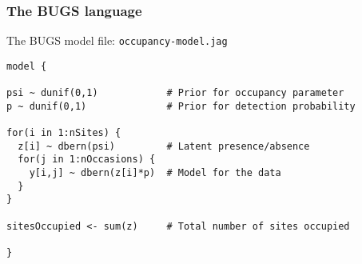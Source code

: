 \documentclass[color=usenames,dvipsnames,handout]{beamer}\usepackage[]{graphicx}\usepackage[]{xcolor}
\makeatletter
\newenvironment{kframe}{%
 \def\at@end@of@kframe{}%
 \ifinner\ifhmode%
  \def\at@end@of@kframe{\end{minipage}}%
  \begin{minipage}{\columnwidth}%
 \fi\fi%
 \def\FrameCommand##1{\hskip\@totalleftmargin \hskip-\fboxsep
 \colorbox{shadecolor}{##1}\hskip-\fboxsep
     \hskip-\linewidth \hskip-\@totalleftmargin \hskip\columnwidth}%
 \MakeFramed {\advance\hsize-\width
   \@totalleftmargin\z@ \linewidth\hsize
   \@setminipage}}%
 {\par\unskip\endMakeFramed%
 \at@end@of@kframe}
\newenvironment{knitrout}{}{} %
\makeatother
\begin{document}
\begin{frame}[fragile]
  \frametitle{The BUGS language}
  The BUGS model file: {\tt occupancy-model.jag}
\begin{knitrout}\scriptsize
{}\color{fgcolor}\begin{kframe}
\begin{verbatim}
model {

psi ~ dunif(0,1)            # Prior for occupancy parameter
p ~ dunif(0,1)              # Prior for detection probability

for(i in 1:nSites) {
  z[i] ~ dbern(psi)         # Latent presence/absence
  for(j in 1:nOccasions) {
    y[i,j] ~ dbern(z[i]*p)  # Model for the data
  }
}

sitesOccupied <- sum(z)     # Total number of sites occupied

}
\end{verbatim}
\end{kframe}
\end{knitrout}
\end{frame}
\end{document}
